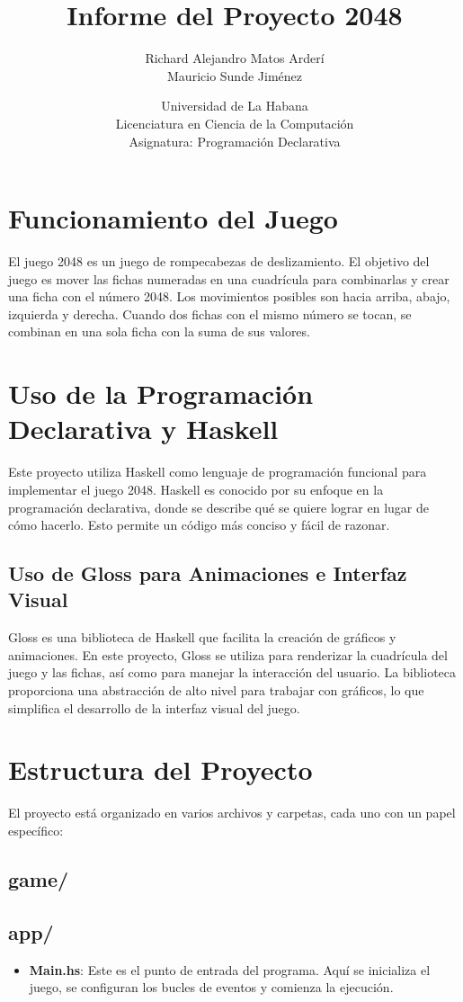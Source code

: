 \documentclass{article}
\title{Informe del Proyecto 2048}
\author{Richard Alejandro Matos Arderí \\ Mauricio Sunde Jiménez}
\date{Universidad de La Habana \\ Licenciatura en Ciencia de la Computación \\ Asignatura: Programación Declarativa}
\begin{document}
\maketitle

\section{Funcionamiento del Juego}
El juego 2048 es un juego de rompecabezas de deslizamiento. El objetivo del juego es mover las fichas numeradas en una cuadrícula para combinarlas y crear una ficha con el número 2048. Los movimientos posibles son hacia arriba, abajo, izquierda y derecha. Cuando dos fichas con el mismo número se tocan, se combinan en una sola ficha con la suma de sus valores.

\section{Uso de la Programación Declarativa y Haskell}
Este proyecto utiliza Haskell como lenguaje de programación funcional para implementar el juego 2048. Haskell es conocido por su enfoque en la programación declarativa, donde se describe qué se quiere lograr en lugar de cómo hacerlo. Esto permite un código más conciso y fácil de razonar.

\subsection{Uso de Gloss para Animaciones e Interfaz Visual}
Gloss es una biblioteca de Haskell que facilita la creación de gráficos y animaciones. En este proyecto, Gloss se utiliza para renderizar la cuadrícula del juego y las fichas, así como para manejar la interacción del usuario. La biblioteca proporciona una abstracción de alto nivel para trabajar con gráficos, lo que simplifica el desarrollo de la interfaz visual del juego.

\section{Estructura del Proyecto}
El proyecto está organizado en varios archivos y carpetas, cada uno con un papel específico:

\subsection{game/}

\subsection{app/}
\begin{itemize}
    \item \textbf{Main.hs}: Este es el punto de entrada del programa. Aquí se inicializa el juego, se configuran los bucles de eventos y comienza la ejecución.
\end{itemize}
\end{document}
